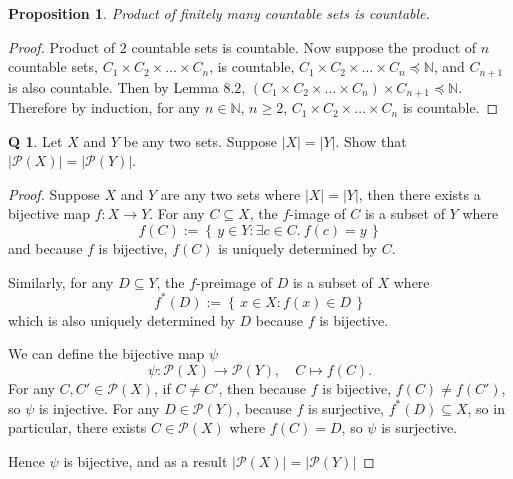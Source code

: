 \documentclass[12pt]{article}
\newcommand{\set}[1]{\left\{\,#1\,\right\}}
\newtheorem*{prop}{Proposition}
\theoremstyle{definition}
\newtheorem{qn}{Q}
\numberwithin{equation}{qn}
\numberwithin{lemma}{qn}
\newcommand{\nat}{\mathbb{N}}
\let\euscr\mathscr \let\mathscr\relax%
\newcommand{\power}{\euscr{P}}
\renewcommand{\preceq}{\preccurlyeq}
\renewcommand{\geq}{\geqslant}
\begin{document}
\begin{prop}
    Product of finitely many countable sets is countable.
\end{prop}
\begin{proof}
    Product of $2$ countable sets is countable. Now
    suppose the product of $n$ countable sets, $C_1\times C_2\times \dots \times C_n$, is countable,
    $C_1\times C_2\times\dots \times C_n \preceq \nat$, and $C_{n+1}$ is also countable.
    Then by Lemma 8.2, $(C_1\times C_2\times\dots \times C_n)\times C_{n+1} \preceq \nat$.
    Therefore by induction, for any $n\in\nat$, $n\geq 2$, $C_1\times C_2\times\dots\times C_n$ is countable.
\end{proof}

\newpage
\begin{qn}
    Let $X$ and $Y$ be any two sets. Suppose $|X| = |Y|$. Show that $|\power(X)| = |\power(Y)|$.
\end{qn}
\begin{proof}
    Suppose $X$ and $Y$ are any two sets where $|X| = |Y|$, then there exists a bijective map
    $f: X \rightarrow Y$.
    For any $C \subseteq X$, the $f$-image of $C$ is a subset of $Y$ where
    \[ f(C) := \set{y\in Y: \exists c\in C.~ f(c) = y} \]
    and because $f$ is bijective, $f(C)$ is uniquely determined by $C$.

    Similarly, for any $D \subseteq Y$, the $f$-preimage of $D$ is a subset of $X$ where
    \[ f^*(D) := \set{x\in X: f(x)\in D} \]
    which is also uniquely determined by $D$ because $f$ is bijective.

    We can define the bijective map $\psi$
    \[ \psi: \power(X) \rightarrow \power(Y),\quad C \mapsto f(C).  \]
    For any $C, C'\in\power(X)$, if $C \ne C'$, then because $f$ is bijective, $f(C)\ne f(C')$,
    so $\psi$ is injective.
    For any $D\in\power(Y)$, because $f$ is surjective, $f^*(D)\subseteq X$,
    so in particular, there exists $C\in\power(X)$ where $f(C) = D$, so $\psi$ is surjective.

    Hence $\psi$ is bijective, and as a result $|\power(X)| = |\power(Y)|$
\end{proof}
\end{document}
